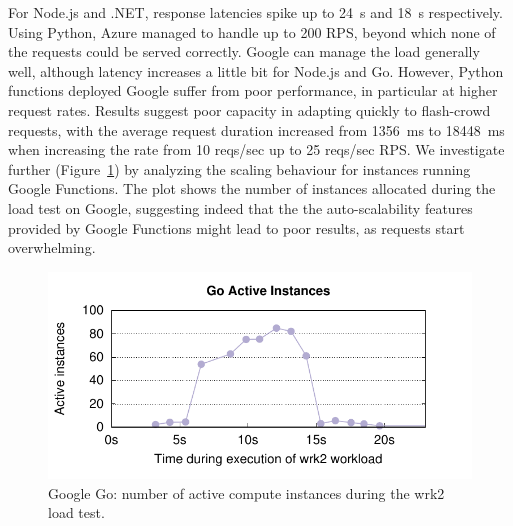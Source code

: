For Node.js and .NET, response latencies spike up to 24~s and 18~s respectively. %
Using Python, Azure managed to handle up to 200 \gls{RPS}, beyond which none of the requests could be served correctly.
Google can manage the load generally well, although latency increases a little bit for Node.js and Go. 
However, Python functions deployed Google suffer from poor performance, in particular at higher request rates. 
Results suggest poor capacity in adapting quickly to flash-crowd requests, with the average request duration increased from 1356~ms to 18448~ms when increasing the rate from 10 reqs/sec up to 25 reqs/sec \gls{RPS}. 
We investigate further (Figure~\ref{fig:google_graph_go}) by analyzing the scaling behaviour for instances running Google Functions.
The plot shows the number of instances allocated during the load test on Google, suggesting indeed that the the auto-scalability features provided by Google Functions might lead to poor results, as requests start overwhelming.

\begin{figure}[!t]
\centering
\includegraphics[scale=0.7]{bilder/go_instances/go_instances.pdf}
\caption{Google Go: number of active compute instances during the wrk2 load test.}
\label{fig:google_graph_go}
\end{figure}

